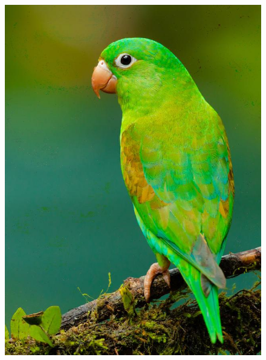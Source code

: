 \begin{figure}
\begin{minipage}[c]{0.33\linewidth}
    \includegraphics[width=1.\linewidth]{images/hpcom/parrot3_rx.jpg}
  \end{minipage}
  \begin{minipage}[c]{0.33\linewidth}
    \centering

\end{minipage}
\end{figure}
